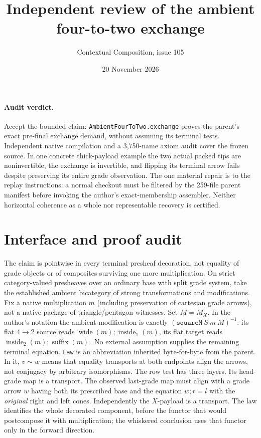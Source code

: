 \documentclass[11pt]{article}
\title{Independent review of the ambient four-to-two exchange}
\author{Contextual Composition, issue 105}\date{20 November 2026}
\newcommand{\nm}[1]{\nolinkurl{#1}}
\newcommand{\al}{\mathrel{\sim}}
\begin{document}
\maketitle
\paragraph{Audit verdict.}
Accept the bounded claim: \nm{AmbientFourToTwo.exchange} proves the parent's exact pre-final exchange demand, without assuming its terminal tests. Independent native compilation and a 3,750-name axiom audit cover the frozen source. In one concrete thick-payload example the two actual packed tips are noninvertible, the exchange is invertible, and flipping its terminal arrow fails despite preserving its entire grade observation. The one material repair is to the replay instructions: a normal checkout must be filtered by the 259-file parent manifest before invoking the author's exact-membership assembler. Neither horizontal coherence as a whole nor representable recovery is certified.
\section*{Interface and proof audit}
The claim is pointwise in every terminal presheaf decoration, not equality of grade objects or of composites surviving one more multiplication. On strict category-valued presheaves over an ordinary base with split grade system, take the established ambient bicategory of strong transformations and modifications. Fix a native multiplication $m$ (including preservation of cartesian grade arrows), not a native package of triangle/pentagon witnesses. Set $M=M_X$. In the author's notation the ambient modification is exactly $(\mathtt{squareM}\ S\ m\ M)^{-1}$: its flat $4\to2$ source reads $\operatorname{wide}(m);\operatorname{inside}_1(m)$, its flat target reads $\operatorname{inside}_2(m);\operatorname{suffix}(m)$. \,No external assumption supplies the remaining terminal equation. \nm{Law} is an abbreviation inherited byte-for-byte from the parent. In it, $v\al w$ means that equality transports at both endpoints align the arrows, not conjugacy by arbitrary isomorphisms.
The row test has three layers. Its head-grade map is a transport. The observed last-grade map must align with a grade arrow $w$ having both its prescribed base and the equation $w;r=l$ with the \emph{original} right and left cones. Independently the $X$-payload is a transport. The law identifies the whole decorated component, before the functor that would postcompose it with multiplication; the whiskered conclusion uses that functor only in the forward direction.
\end{document}
